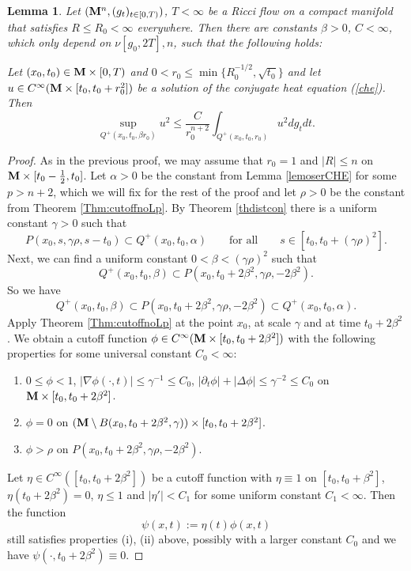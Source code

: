 \documentclass[11pt]{amsart}
\numberwithin{equation}{section}
\newtheorem{lemma}[theorem]{Lemma}
\def\M{{\bf M}}
\numberwithin{equation}{section}
\begin{document}
\begin{lemma} \label{leCHEmv}
Let $(\M^n, (g_t)_{t \in [0,T)})$, $T < \infty$ be a Ricci flow on a compact manifold that satisfies $R \leq R_0 < \infty$ everywhere.
Then there are constants $\beta > 0$, $C < \infty$, which only depend on $\nu[g_0, 2T], n$, such that the following holds:

Let $(x_0, t_0) \in {\M} \times [0, T)$ and $0 < r_0 \leq \min \{ R_0^{-1/2}, \sqrt{t_0} \}$ and let $u \in C^\infty ( \M \times [t_0, t_0 + r_0^2])$ be a solution of the conjugate heat equation (\ref{che}).
Then
\[
\sup_{Q^+(x_0, t_0, \beta r_0)} u^2 \le \frac{C}{r_0^{n+2}}
\int_{Q^+(x_0, t_0, r_0)} u^2 dg_t dt.
\]
\end{lemma}

\begin{proof}
As in the previous proof, we may assume that $r_0 = 1$ and $|R|  \leq n$ on $\M \times [t_0 - \frac12, t_0]$.
Let $\alpha  > 0$ be the constant from Lemma \ref{lemoserCHE} for some $p > n+2$, which we will fix for the rest of the proof and let $\rho > 0$ be the constant from Theorem \ref{Thm:cutoffnoLp}.
By Theorem \ref{thdistcon} there is a uniform constant $\gamma > 0$ such that
\[ P(x_0, s, \gamma \rho , s-t_0) \subset Q^+ (x_0, t_0, \alpha) \qquad \text{for all} \qquad s \in [t_0, t_0 + (\gamma \rho)^2]. \]
Next, we can find a uniform constant $0 < \beta < (\gamma \rho)^2$ such that
\[ Q^+ (x_0, t_0, \beta) \subset P(x_0, t_0 + 2\beta^2, \gamma \rho, - 2\beta^2). \]
So we have
\begin{equation} \label{eq:PinOmega}
 Q^+ (x_0, t_0, \beta) \subset P(x_0, t_0 + 2 \beta^2, \gamma \rho, - 2 \beta^2) \subset Q^+ (x_0, t_0, \alpha ).
 \end{equation}
Apply Theorem \ref{Thm:cutoffnoLp} at the point $x_0$, at scale $\gamma$ and at time $t_0 + 2\beta^2$.
We obtain a cutoff function $\phi \in C^\infty ( \M \times [t_0, t_0 + 2 \beta^2])$ with the following properties for some universal constant $C_0 < \infty$:
\begin{enumerate}[label=(\roman*)]
\item $0 \leq \phi < 1$, $| \nabla \phi (\cdot, t) | \leq \gamma^{-1} \leq C_0$, $|\partial_t \phi| + |\Delta \phi | \leq \gamma^{-2} \leq C_0$ on $\M \times [t_0, t_0 + 2\beta^2]$.
\item $\phi = 0$ on $(\M \setminus B(x_0, t_0 + 2 \beta^2, \gamma)) \times [t_0, t_0 + 2\beta^2]$.
\item $\phi > \rho$ on $P(x_0, t_0 + 2\beta^2, \gamma \rho, - 2\beta^2)$.
\end{enumerate}
Let $\eta \in C^\infty ([t_0, t_0 + 2\beta^2])$ be a cutoff function with $\eta \equiv 1$ on $[t_0, t_0 + \beta^2]$, $\eta (t_0 +2\beta^2) = 0$, $\eta \leq 1$ and $|\eta' | < C_1$ for some uniform constant $C_1 < \infty$.
Then the function
\[ \psi (x,t) := \eta (t) \phi (x,t) \]
still satisfies properties (i), (ii) above, possibly with a larger constant $C_0$ and we have $\psi (\cdot, t_0 +2\beta^2) \equiv 0$.


\end{proof}
\end{document}
